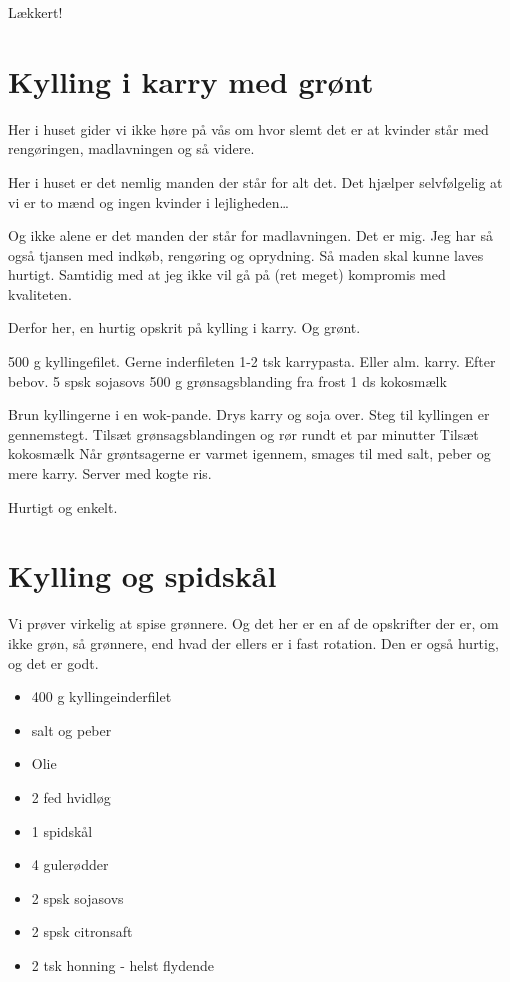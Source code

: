 \documentclass[
]{book}
\providecommand{\tightlist}{%
  \setlength{\itemsep}{0pt}\setlength{\parskip}{0pt}}
\begin{document}
Lækkert!

\section{Kylling i karry med grønt}\label{kylling-i-karry-med-gruxf8nt}

Her i huset gider vi ikke høre på vås om hvor slemt det er at kvinder står med rengøringen, madlavningen og så videre.

Her i huset er det nemlig manden der står for alt det. Det hjælper selvfølgelig at vi er to mænd og ingen kvinder i lejligheden\ldots{}

Og ikke alene er det manden der står for madlavningen. Det er mig. Jeg har så også tjansen med indkøb, rengøring og oprydning. Så maden skal kunne laves hurtigt. Samtidig med at jeg ikke vil gå på (ret meget) kompromis med kvaliteten.

Derfor her, en hurtig opskrit på kylling i karry. Og grønt.

500 g kyllingefilet. Gerne inderfileten
1-2 tsk karrypasta. Eller alm. karry. Efter bebov.
5 spsk sojasovs
500 g grønsagsblanding fra frost
1 ds kokosmælk

Brun kyllingerne i en wok-pande. Drys karry og soja over.
Steg til kyllingen er gennemstegt.
Tilsæt grønsagsblandingen og rør rundt et par minutter
Tilsæt kokosmælk
Når grøntsagerne er varmet igennem, smages til med salt, peber og mere karry.
Server med kogte ris.

Hurtigt og enkelt.

\section{Kylling og spidskål}\label{kylling-og-spidskuxe5l}

Vi prøver virkelig at spise grønnere. Og det her er en af de opskrifter der er, om ikke grøn, så grønnere, end hvad der ellers er i fast rotation. Den er også hurtig, og det er godt.

\begin{itemize}
\tightlist
\item
  400 g kyllingeinderfilet
\item
  salt og peber
\item
  Olie
\item
  2 fed hvidløg
\item
  1 spidskål
\item
  4 gulerødder
\item
  2 spsk sojasovs
\item
  2 spsk citronsaft
\item
  2 tsk honning - helst flydende
\end{itemize}
\end{document}
